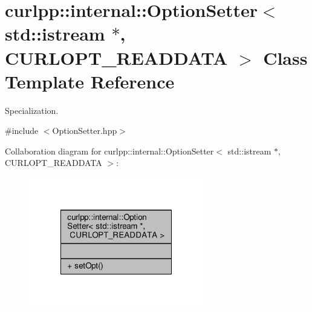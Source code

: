 \hypertarget{classcurlpp_1_1internal_1_1OptionSetter_3_01std_1_1istream_01_5_00_01CURLOPT__READDATA_01_4}{\section{curlpp\-:\-:internal\-:\-:Option\-Setter$<$ std\-:\-:istream $\ast$, C\-U\-R\-L\-O\-P\-T\-\_\-\-R\-E\-A\-D\-D\-A\-T\-A $>$ Class Template Reference}
\label{classcurlpp_1_1internal_1_1OptionSetter_3_01std_1_1istream_01_5_00_01CURLOPT__READDATA_01_4}
}


Specialization.  




{\ttfamily \#include $<$Option\-Setter.\-hpp$>$}



Collaboration diagram for curlpp\-:\-:internal\-:\-:Option\-Setter$<$ std\-:\-:istream $\ast$, C\-U\-R\-L\-O\-P\-T\-\_\-\-R\-E\-A\-D\-D\-A\-T\-A $>$\-:\nopagebreak
\begin{figure}[H]
\begin{center}
\leavevmode
\includegraphics[width=216pt]{classcurlpp_1_1internal_1_1OptionSetter_3_01std_1_1istream_01_5_00_01CURLOPT__READDATA_01_4__coll__graph}
\end{center}
\end{figure}
